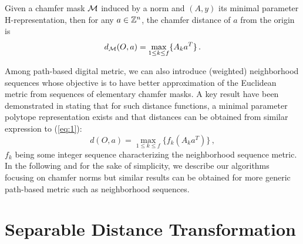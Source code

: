 \documentclass{llncs}
\begin{document}
\begin{proposition}
  Given a chamfer mask $\mathcal{M}$ induced by a  norm and $(A,y)$ its minimal
  parameter H-representation, then for any $a\in{\mathbb{Z}}^n$, the chamfer
  distance of $a$ from the origin is
  \begin{equation}
    \label{eq:1}
    d_{\mathcal{M}}(O,a) =  \max_{1\leq k \leq f} \{ A_k a^T\}\,.
  \end{equation}
\end{proposition}
Among path-based digital metric, we can also introduce (weighted)
neighborhood sequences
\cite{Rosenfeld1966,mukherjee,Strand2008,DBLP:conf/dgci/NormandSE13}
whose objective is to have better approximation of the Euclidean
metric from sequences of elementary chamfer masks.  A key result have
been demonstrated in \cite{DBLP:conf/dgci/NormandSE13} stating that
for such distance functions, a minimal parameter polytope
representation exists and that distances can be obtained from similar
expression to (\ref{eq:1}):
\begin{equation}
  d(O,a)  =\max_{1\leq k \leq f} \{ f_k(A_k a^T)\}\,,
\end{equation}
$f_k$ being some integer sequence characterizing the neighborhood
sequence metric. In the following and for the sake of simplicity, we
describe our algorithms focusing on chamfer norms but similar results
can be obtained for more generic path-based metric such as
neighborhood sequences.
\section{Separable Distance Transformation}
\label{sec:separ-dist-transf}
\end{document}
